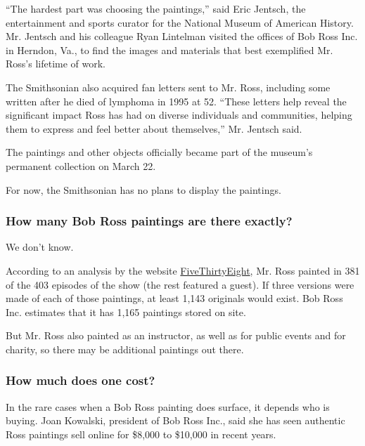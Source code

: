``The hardest part was choosing the paintings,'' said Eric Jentsch, the
entertainment and sports curator for the National Museum of American
History. Mr. Jentsch and his colleague Ryan Lintelman visited the
offices of Bob Ross Inc. in Herndon, Va., to find the images and
materials that best exemplified Mr. Ross's lifetime of work.

The Smithsonian also acquired fan letters sent to Mr. Ross, including
some written after he died of lymphoma in 1995 at 52. ``These letters
help reveal the significant impact Ross has had on diverse individuals
and communities, helping them to express and feel better about
themselves,'' Mr. Jentsch said.

The paintings and other objects officially became part of the museum's
permanent collection on March 22.

For now, the Smithsonian has no plans to display the paintings.

\hypertarget{how-many-bob-ross-paintings-are-there-exactly}{%
\subsubsection{\texorpdfstring{\textbf{How many Bob Ross paintings are
there
exactly?}}{How many Bob Ross paintings are there exactly?}}\label{how-many-bob-ross-paintings-are-there-exactly}}

We don't know.

According to an analysis by the website
\href{https://fivethirtyeight.com/features/a-statistical-analysis-of-the-work-of-bob-ross/}{FiveThirtyEight},
Mr. Ross painted in 381 of the 403 episodes of the show (the rest
featured a guest). If three versions were made of each of those
paintings, at least 1,143 originals would exist. Bob Ross Inc. estimates
that it has 1,165 paintings stored on site.

But Mr. Ross also painted as an instructor, as well as for public events
and for charity, so there may be additional paintings out there.

\hypertarget{how-much-does-one-cost-}{%
\subsubsection{\texorpdfstring{\textbf{How much does one cost?}
}{How much does one cost? }}\label{how-much-does-one-cost-}}

In the rare cases when a Bob Ross painting does surface, it depends who
is buying. Joan Kowalski, president of Bob Ross Inc., said she has seen
authentic Ross paintings sell online for \$8,000 to \$10,000 in recent
years.

